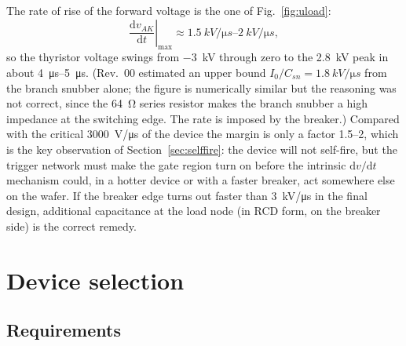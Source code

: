 \documentclass[11pt,a4paper]{article}
\begin{document}
The rate of rise of the forward voltage is the one of Fig.~\ref{fig:uload}:
\begin{equation}
  \left.\frac{\mathrm{d}v_{AK}}{\mathrm{d}t}\right|_{\max} \approx \SIrange{1.5}{2}{kV/\micro s},
  \label{eq:dvdt}
\end{equation}
so the thyristor voltage swings from \SI{-3}{kV} through zero to the \SI{2.8}{kV} peak in about
\SIrange{4}{5}{\micro s}. (Rev.~00 estimated an upper bound $I_0/C_{sn} = \SI{1.8}{kV/\micro s}$
from the branch snubber alone; the figure is numerically similar but the reasoning was not
correct, since the \SI{64}{\ohm} series resistor makes the branch snubber a high impedance at
the switching edge. The rate is imposed by the breaker.) Compared with the critical
\SI{3000}{V/\micro s} of the device the margin is only a factor \numrange{1.5}{2}, which is the
key observation of Section~\ref{sec:selffire}: the device will not self-fire, but the trigger
network must make the gate region turn on before the intrinsic $\mathrm{d}v/\mathrm{d}t$
mechanism could, in a hotter device or with a faster breaker, act somewhere else on the wafer.
If the breaker edge turns out faster than \SI{3}{kV/\micro s} in the final design, additional
capacitance at the load node (in RCD form, on the breaker side) is the correct remedy.

\section{Device selection}

\subsection{Requirements}
\end{document}
